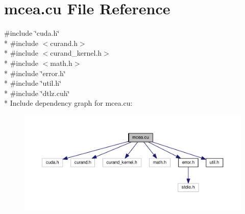 \hypertarget{mcea_8cu}{}\section{mcea.\+cu File Reference}
\label{mcea_8cu}
{\ttfamily \#include \char`\"{}cuda.\+h\char`\"{}}\\*
{\ttfamily \#include $<$curand.\+h$>$}\\*
{\ttfamily \#include $<$curand\+\_\+kernel.\+h$>$}\\*
{\ttfamily \#include $<$math.\+h$>$}\\*
{\ttfamily \#include \char`\"{}error.\+h\char`\"{}}\\*
{\ttfamily \#include \char`\"{}util.\+h\char`\"{}}\\*
{\ttfamily \#include \char`\"{}dtlz.\+cuh\char`\"{}}\\*
Include dependency graph for mcea.\+cu\+:
\nopagebreak
\begin{figure}[H]
\begin{center}
\leavevmode
\includegraphics[width=350pt]{mcea_8cu__incl}
\end{center}
\end{figure}
